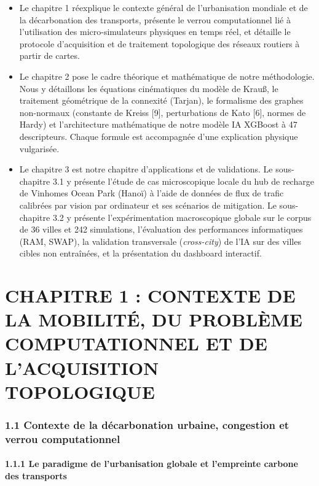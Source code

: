 \documentclass[10pt, a4paper]{article}
\providecommand{\tightlist}{}
\begin{document}
\begin{itemize}
\tightlist
\item
  Le chapitre 1 réexplique le contexte général de l'urbanisation
  mondiale et de la décarbonation des transports, présente le verrou
  computationnel lié à l'utilisation des micro-simulateurs physiques en
  temps réel, et détaille le protocole d'acquisition et de traitement
  topologique des réseaux routiers à partir de cartes.
\item
  Le chapitre 2 pose le cadre théorique et mathématique de notre
  méthodologie. Nous y détaillons les équations cinématiques du modèle
  de Krauß, le traitement géométrique de la connexité (Tarjan), le
  formalisme des graphes non-normaux (constante de Kreiss {[}9{]},
  perturbations de Kato {[}6{]}, normes de Hardy) et l'architecture
  mathématique de notre modèle IA XGBoost à 47 descripteurs. Chaque
  formule est accompagnée d'une explication physique vulgarisée.
\item
  Le chapitre 3 est notre chapitre d'applications et de validations. Le
  sous-chapitre 3.1 y présente l'étude de cas microscopique locale du
  hub de recharge de Vinhomes Ocean Park (Hanoï) à l'aide de données de
  flux de trafic calibrées par vision par ordinateur et ses scénarios de
  mitigation. Le sous-chapitre 3.2 y présente l'expérimentation
  macroscopique globale sur le corpus de 36 villes et 242 simulations,
  l'évaluation des performances informatiques (RAM, SWAP), la validation
  transversale (\emph{cross-city}) de l'IA sur des villes cibles non
  entraînées, et la présentation du dashboard interactif.
\end{itemize}

\newpage

\section{CHAPITRE 1 : CONTEXTE DE LA MOBILITÉ, DU PROBLÈME
COMPUTATIONNEL ET DE L'ACQUISITION
TOPOLOGIQUE}\label{chapitre-1-contexte-de-la-mobilituxe9-du-probluxe8me-computationnel-et-de-lacquisition-topologique}

\subsubsection{1.1 Contexte de la décarbonation urbaine, congestion et
verrou
computationnel}\label{contexte-de-la-duxe9carbonation-urbaine-congestion-et-verrou-computationnel}

\paragraph{1.1.1 Le paradigme de l'urbanisation globale et l'empreinte
carbone des
transports}\label{le-paradigme-de-lurbanisation-globale-et-lempreinte-carbone-des-transports}
\end{document}
